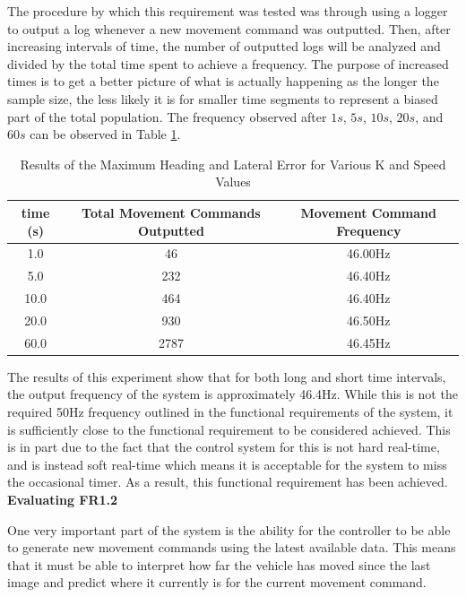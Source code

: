 \documentclass[titlepage, draft]{article}
\begin{document}
{The procedure by which this requirement was tested was through using a logger to output a log whenever a new movement command was outputted. Then, after increasing intervals of time, the number of outputted logs will be analyzed and divided by the total time spent to achieve a frequency. The purpose of increased times is to get a better picture of what is actually happening as the longer the sample size, the less likely it is for smaller time segments to represent a biased part of the total population. The frequency observed after \(1s\), \(5s\), \(10s\), \(20s\), and \(60s\) can be observed in Table \ref{tab:frequency}.

\begin{table}
	\centering
	\begin{tabular}{| c | c | c |}
		\hline
		time (s) & Total Movement Commands Outputted & Movement Command Frequency \\ [0.5ex]
		\hline
		1.0      & 46                                & 46.00Hz                    \\
		\hline
		5.0      & 232                               & 46.40Hz                    \\
		\hline
		10.0     & 464                               & 46.40Hz                    \\
		\hline
		20.0     & 930                               & 46.50Hz                    \\
		\hline
		60.0     & 2787                              & 46.45Hz                    \\
		\hline
	\end{tabular}
	\caption{Results of the Maximum Heading and Lateral Error for Various K and Speed Values}
	\label{tab:frequency}
\end{table}


The results of this experiment show that for both long and short time intervals, the output frequency of the system is approximately 46.4Hz. While this is not the required 50Hz frequency outlined in the functional requirements of the system, it is sufficiently close to the functional requirement to be considered achieved. This is in part due to the fact that the control system for this is not hard real-time, and is instead soft real-time which means it is acceptable for the system to miss the occasional timer. As a result, this functional requirement has been achieved.
\\

\textbf{Evaluating FR1.2}

One very important part of the system is the ability for the controller to be able to generate new movement commands using the latest available data. This means that it must be able to interpret how far the vehicle has moved since the last image and predict where it currently is for the current movement command.

}
\end{document}
